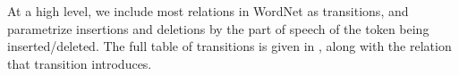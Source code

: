 At a high level, we include most relations in WordNet as transitions,
  and parametrize insertions and deletions by the part of speech
  of the token being inserted/deleted.
The full table of transitions is given in , along
  with the relation that transition introduces.

\begin{table}
\begin{center}
  

\end{center}
\end{table}
